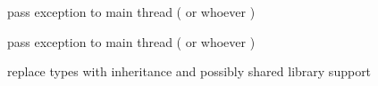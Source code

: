 
\begin{DoxyRefList}
\item[\label{todo__todo000018}%
\hypertarget{todo__todo000018}{}%
\-Member \hyperlink{classgal_1_1network_1_1communicating_abd5efaa6563dda2097f69ae3679f87a1}{gal\-:\-:network\-:\-:communicating\-:\-:thread\-\_\-read} ()]pass exception to main thread ( or whoever )  
\item[\label{todo__todo000017}%
\hypertarget{todo__todo000017}{}%
\-Member \hyperlink{classgal_1_1network_1_1communicating_ae183aa977aa6963e96a1abe2a94a749c}{gal\-:\-:network\-:\-:communicating\-:\-:thread\-\_\-write} (std\-::shared\-\_\-ptr$<$ message $>$)]pass exception to main thread ( or whoever )  
\item[\label{todo__todo000021}%
\hypertarget{todo__todo000021}{}%
\-Namespace \hyperlink{namespaceNeb}{\-Neb} ]replace types with inheritance and possibly shared library support 


\end{DoxyRefList}
